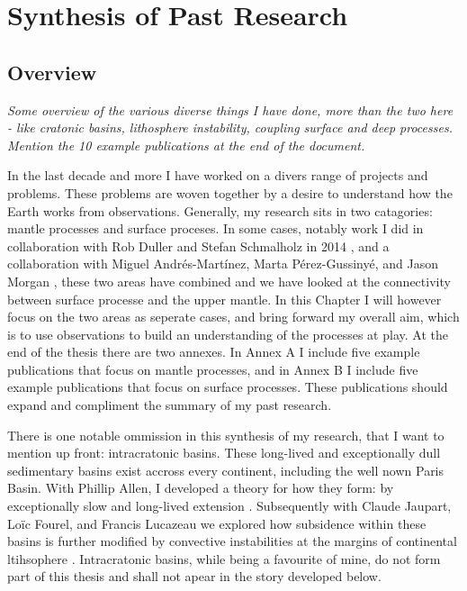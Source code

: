 \chapter{Synthesis of Past Research}

\section{Overview}

\emph{Some overview of the various diverse things I have done, more than the two here - like cratonic basins, lithosphere instability, coupling surface and deep processes. Mention the 10 example publications at the end of the document.}

In the last decade and more I have worked on a divers range of projects and problems. These problems are woven together by a desire to understand how the Earth works from observations. Generally, my research sits in two catagories: mantle processes and surface proceses. In some cases, notably work I did in collaboration with Rob Duller and Stefan Schmalholz in 2014 \citep{armitage-etal-2014}, and a collaboration with Miguel Andrés-Mart\'inez, Marta Pérez-Gussinyé, and Jason Morgan \citep{andres-martinez-etal-2019}, these two areas have combined and we have looked at the connectivity between surface processe and the upper mantle. In this Chapter I will however focus on the two areas as seperate cases, and bring forward my overall aim, which is to use observations to build an understanding of the processes at play. At the end of the thesis there are two annexes. In Annex A I include five example publications that focus on mantle processes, and in Annex B I include five example publications that focus on surface processes. These publications should expand and compliment the summary of my past research.

There is one notable ommission in this synthesis of my research, that I want to mention up front: intracratonic basins. These long-lived and exceptionally dull sedimentary basins exist accross every continent, including the well nown Paris Basin. With Phillip Allen, I developed a theory for how they form: by exceptionally slow and long-lived extension \citep{armitage-2010,allen-2012}. Subsequently with Claude Jaupart, Loïc Fourel, and Francis Lucazeau we explored how subsidence within these basins is further modified by convective instabilities at the margins of continental ltihsophere \citep{armitage-etal-2013,lucazeau-etal-2015}. Intracratonic basins, while being a favourite of mine, do not form part of this thesis and shall not apear in the story developed below.

